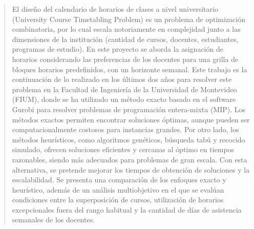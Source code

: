 \begin{abstract}

El diseño del calendario de horarios de clases a nivel universitario (University Course Timetabling Problem) es un problema de optimización combinatoria, por lo cual escala notoriamente en complejidad junto a las dimensiones de la institución (cantidad de cursos, docentes, estudiantes, programas de estudio). En este proyecto se aborda la asignación de horarios considerando las preferencias de los docentes para una grilla de bloques horarios predefinidos, con un horizonte semanal. Este trabajo es la continuación de lo realizado en los últimos dos años para resolver este problema en la Facultad de Ingeniería de la Universidad de Montevideo (FIUM), donde se ha utilizado un método exacto basado en el software Gurobi para resolver problemas de programación entera-mixta (MIP). Los métodos exactos permiten encontrar soluciones óptimas, aunque pueden ser computacionalmente costosos para instancias grandes. Por otro lado, los métodos heurísticos, como algoritmos genéticos, búsqueda tabú y recocido simulado, ofrecen soluciones eficientes y cercanas al óptimo en tiempos razonables, siendo más adecuados para problemas de gran escala. Con esta alternativa, se pretende mejorar los tiempos de obtención de soluciones y la escalabilidad. Se presenta una comparación de los enfoques exacto y heurístico, además de un análisis multiobjetivo en el que se evalúan condiciones entre la superposición de cursos, utilización de horarios excepcionales fuera del rango habitual y la cantidad de días de asistencia semanales de los docentes.

\end{abstract}

